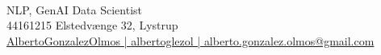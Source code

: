 
\author{\textcolor{\primaryColorToUse}{Alberto 
 }\textcolor{\secondaryColorToUse}{ 
 Gonz\'alez Olmos}} %
\def\phone{ 44161215 }
\def\city{ Elstedvænge 32, Lystrup}
\def\github{ AlbertoGonzalezOlmos | } %
\def\LinkedIn{ albertoglezol | } %
\def\email{alberto.gonzalez.olmos@gmail.com}
\def\role{NLP, GenAI Data Scientist} %


\begin{center}
	\begin{minipage}[b]{1\textwidth}
	\makeatletter
	\centering {\huge \@author} \\
	\makeatother
    \vspace{1.5em}
    {\Large{\role}} \\
	\vspace{1em}
	{\faMobile*}{\phone}%
	{\faMapMarker*}{\small \city} \\ %
	\href{https://github.com/\github}{\faGithub \github}%
	\href{https://www.linkedin.com/in/\LinkedIn}{\faLinkedin   \LinkedIn} %
	\href{mailto:\email}{ \email}  %
	\end{minipage}
\end{center}


